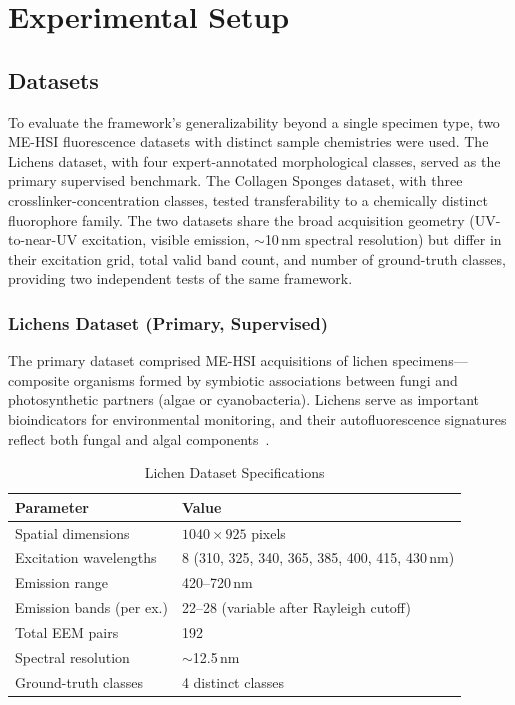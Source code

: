\section{Experimental Setup}
\label{sec:experimental_setup}

\subsection{Datasets}
\label{sec:datasets}

To evaluate the framework's generalizability beyond a single specimen type, two ME-HSI fluorescence datasets with distinct sample chemistries were used.
The Lichens dataset, with four expert-annotated morphological classes, served as the primary supervised benchmark.
The Collagen Sponges dataset, with three crosslinker-concentration classes, tested transferability to a chemically distinct fluorophore family.
The two datasets share the broad acquisition geometry (UV-to-near-UV excitation, visible emission, $\sim$10\,nm spectral resolution) but differ in their excitation grid, total valid band count, and number of ground-truth classes, providing two independent tests of the same framework.

\subsubsection{Lichens Dataset (Primary, Supervised)}
\label{sec:dataset_lichens}

The primary dataset comprised ME-HSI acquisitions of lichen specimens---composite organisms formed by symbiotic associations between fungi and photosynthetic partners (algae or cyanobacteria).
Lichens serve as important bioindicators for environmental monitoring, and their autofluorescence signatures reflect both fungal and algal components~\cite{meysurova2021optical}.

\begin{table}[!t]
\centering
\caption{Lichen Dataset Specifications}
\label{tab:dataset}
\begin{tabular}{@{}ll@{}}
\toprule
\textbf{Parameter} & \textbf{Value} \\
\midrule
Spatial dimensions & $1040 \times 925$ pixels \\
Excitation wavelengths & 8 (310, 325, 340, 365, 385, 400, 415, 430\,nm) \\
Emission range & 420--720\,nm \\
Emission bands (per ex.) & 22--28 (variable after Rayleigh cutoff) \\
Total EEM pairs & 192 \\
Spectral resolution & $\sim$12.5\,nm \\
Ground-truth classes & 4 distinct classes \\
\bottomrule
\end{tabular}
\end{table}

